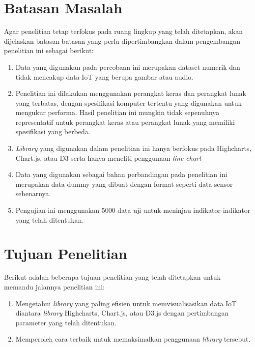 \section{Batasan Masalah}
Agar penelitian tetap terfokus pada ruang lingkup yang telah ditetapkan, akan dijelaskan batasan-batasan yang perlu dipertimbangkan dalam pengembangan penelitian ini sebagai berikut:
\begin{enumerate}
    \item Data yang digunakan pada percobaan ini merupakan dataset numerik dan tidak mencakup data IoT yang berupa gambar atau audio. 
    \item Penelitian ini dilakukan menggunakan perangkat keras dan perangkat lunak yang terbatas, dengan spesifikasi komputer tertentu yang digunakan untuk mengukur performa. Hasil penelitian ini mungkin tidak sepenuhnya representatif untuk perangkat keras atau perangkat lunak yang memiliki spesifikasi yang berbeda.
    \item \textit{Library} yang digunakan dalam penelitian ini hanya berfokus pada Highcharts, Chart.js, atau D3 serta hanya meneliti penggunaan \textit{line chart}
    \item Data yang digunakan sebagai bahan perbandingan pada penelitian ini merupakan data dummy yang dibuat dengan format seperti data sensor sebenarnya.
    \item Pengujian ini menggunakan 5000 data uji untuk meninjau indikator-indikator yang telah ditentukan. 
\end{enumerate}

\section{Tujuan Penelitian}
Berikut adalah beberapa tujuan penelitian yang telah ditetapkan untuk memandu jalannya penelitian ini: 
\begin{enumerate}
    \item Mengetahui \textit{library} yang paling efisien untuk memvisualisasikan data IoT diantara \textit{library} Highcharts, Chart.js, atau D3.js dengan pertimbangan parameter yang telah ditentukan.
    \item Memperoleh cara terbaik untuk memaksimalkan penggunaan \textit{library} tersebut.
\end{enumerate}


